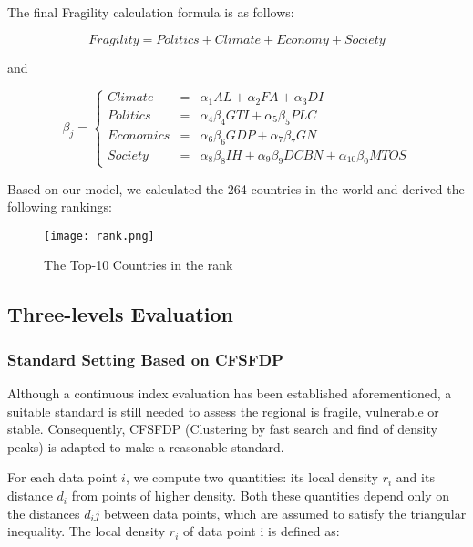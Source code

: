 \documentclass{mcmthesis}
\begin{document}
				The final Fragility calculation formula is as follows:
				
				\begin{equation}
					Fragility =  Politics + Climate + Economy + Society
				\end{equation}
				
				and
				
				$$ 
				\beta_{j}=\left\{
				\begin{array}{rcl}
				Climate& =& \alpha _ { 1 } A L + \alpha _ { 2 } F A + \alpha _ { 3 } D I\\
				Politics& =& \alpha _ { 4 } \beta _ { 4 } G T I + \alpha _ { 5 } \beta _ { 5 } P L C\\
				Economics& =& \alpha _ { 6 } \beta _ { 6 } G D P + \alpha _ { 7 } \beta _ { 7 } G N\\
				Society& =& \alpha _ { 8 } \beta _ { 8 } I H + \alpha _ { 9 } \beta _ { 9 } D C B N + \alpha _ { 10 } \beta _ { 0 } M T O S
				\end{array} \right. 
				$$
				
				Based on our model, we calculated the 264 countries in the world and derived the following rankings:
				
				\begin{figure}[h]
					\small
					\centering
					\texttt{[image: rank.png]}
					\caption{The Top-10 Countries in the rank}
					\label{rank}
				\end{figure}
				
		
		\subsection{Three-levels Evaluation}
		
			\subsubsection{Standard Setting Based on CFSFDP}
		
				Although a continuous index evaluation has been established aforementioned, a suitable standard is still needed to assess the regional is fragile, vulnerable or stable. Consequently, CFSFDP (Clustering by fast search and find of density peaks) is adapted to make a reasonable standard.
				
				For each data point $i$, we compute two quantities: its local density $r_i$ and its distance $d_i$ from points of higher density. Both these quantities depend only on the distances $d_ij$ between data points, which are assumed to satisfy the triangular inequality. The local density $r_i$ of data point i is defined as:
				
\end{document}
